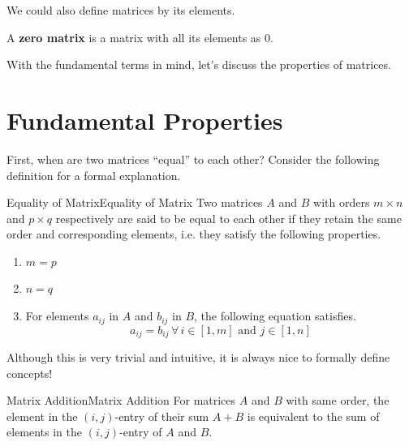 \documentclass[../main.tex]{subfiles}
\begin{document}
We could also define matrices by its elements.

\begin{definition}
A \textbf{zero matrix} is a matrix with all its elements as $0$.
\end{definition}

With the fundamental terms in mind, let's discuss the properties
of matrices.

\section{Fundamental Properties}

First, when are two matrices ``equal'' to each other? Consider
the following definition for a formal explanation.

\begin{theorem}{Equality of Matrix}{Equality of Matrix}
Two matrices $A$ and $B$ with orders $m \times n$ and $p \times q$
respectively are said to be equal to each other if they retain
the same order and corresponding elements, i.e. they satisfy the
following properties.
\begin{enumerate}
\item $m = p$
\item $n = q$
\item
For elements $a_{ij}$ in $A$ and $b_{ij}$ in $B$, the following
equation satisfies.
\[
a_{ij} = b_{ij} \,
    \forall \, i \in [1, m] \text{ and } j \in [1, n]
\]
\end{enumerate}
\end{theorem}

Although this is very trivial and intuitive, it is always nice
to formally define concepts!

\begin{theorem}{Matrix Addition}{Matrix Addition}
For matrices $A$ and $B$ with same order, the element in the
$(i, j)$-entry of their sum $A + B$ is equivalent to the sum of
elements in the $(i, j)$-entry of $A$ and $B$.
\end{theorem}
\end{document}
